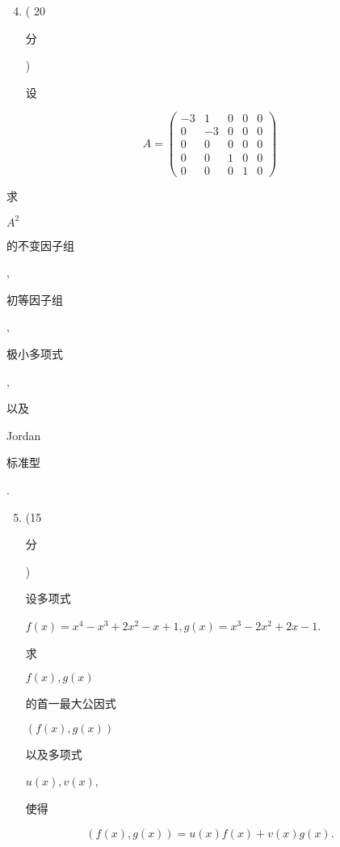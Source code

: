 \documentclass[10pt]{article}
\begin{document}
\begin{enumerate}
  \setcounter{enumi}{3}
  \item ( 20 \begin{CJK}{UTF8}{mj}分\end{CJK}) \begin{CJK}{UTF8}{mj}设\end{CJK}
\end{enumerate}
$$
A=\left(\begin{array}{ccccc}
-3 & 1 & 0 & 0 & 0 \\
0 & -3 & 0 & 0 & 0 \\
0 & 0 & 0 & 0 & 0 \\
0 & 0 & 1 & 0 & 0 \\
0 & 0 & 0 & 1 & 0
\end{array}\right)
$$
\begin{CJK}{UTF8}{mj}求\end{CJK} $A^{2}$ \begin{CJK}{UTF8}{mj}的不变因子组\end{CJK}, \begin{CJK}{UTF8}{mj}初等因子组\end{CJK}, \begin{CJK}{UTF8}{mj}极小多项式\end{CJK}, \begin{CJK}{UTF8}{mj}以及\end{CJK} Jordan \begin{CJK}{UTF8}{mj}标准型\end{CJK}.

\begin{enumerate}
  \setcounter{enumi}{4}
  \item (15 \begin{CJK}{UTF8}{mj}分\end{CJK}) \begin{CJK}{UTF8}{mj}设多项式\end{CJK} $f(x)=x^{4}-x^{3}+2 x^{2}-x+1, g(x)=x^{3}-2 x^{2}+2 x-1$. \begin{CJK}{UTF8}{mj}求\end{CJK} $f(x), g(x)$ \begin{CJK}{UTF8}{mj}的首一最大公因式\end{CJK} $(f(x), g(x))$ \begin{CJK}{UTF8}{mj}以及多项式\end{CJK} $u(x), v(x)$, \begin{CJK}{UTF8}{mj}使得\end{CJK}
\end{enumerate}
$$
(f(x), g(x))=u(x) f(x)+v(x) g(x) .
$$
\end{document}
